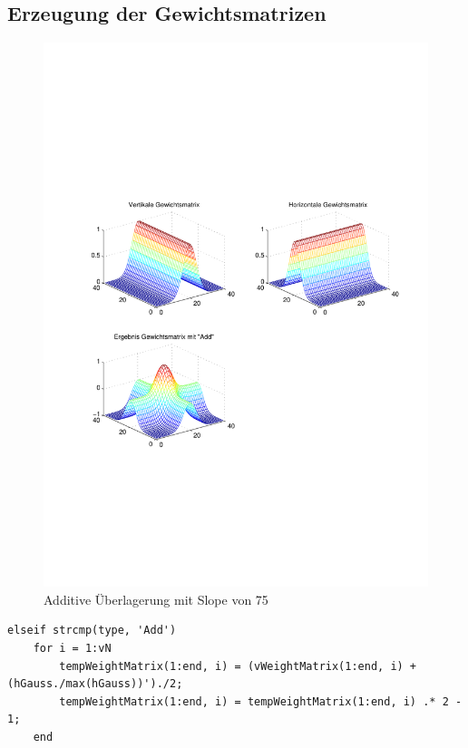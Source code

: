 \subsection{Erzeugung der Gewichtsmatrizen} \label{eGew}
\begin{figure}[hbt]
	\centering
	\includegraphics[width=1\linewidth]{./Bilder/Auswertung/GewichtmatrixEinzelschritte/Endergebnis_Gewichtsmatrix_Slope_75_Type_Add}
	\caption{Additive Überlagerung mit Slope von 75}
	\label{Add75}
\end{figure}

\begin{lstlisting}[label=code:Add75, caption=Auszug Matlab-Skript 'GetGaussWeights()']
elseif strcmp(type, 'Add')
	for i = 1:vN
		tempWeightMatrix(1:end, i) = (vWeightMatrix(1:end, i) + (hGauss./max(hGauss))')./2;
		tempWeightMatrix(1:end, i) = tempWeightMatrix(1:end, i) .* 2 - 1;
	end
\end{lstlisting}

